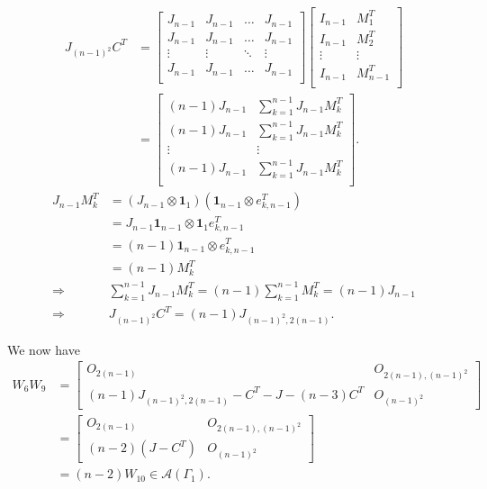 \begin{itemize}
    \begin{align*}
        J_{(n-1)^2}C^T
        &= \begin{bmatrix}
            J_{n-1} & J_{n-1}&\dots&J_{n-1}\\
            J_{n-1} & J_{n-1}&\dots&J_{n-1}\\
            \vdots & \vdots & \ddots & \vdots\\
            J_{n-1} & J_{n-1}&\dots&J_{n-1}\\
        \end{bmatrix}\begin{bmatrix}
            I_{n-1} & M_1^T \\
            I_{n-1} & M_2^T \\
            \vdots & \vdots \\
            I_{n-1} & M_{n-1}^T \\
        \end{bmatrix}\\
        &= \begin{bmatrix}
            (n-1)J_{n-1} & \sum_{k=1}^{n-1} J_{n-1}M_k^T \\
            (n-1)J_{n-1} & \sum_{k=1}^{n-1} J_{n-1}M_k^T \\
            \vdots & \vdots \\
            (n-1)J_{n-1} & \sum_{k=1}^{n-1} J_{n-1}M_k^T \\
        \end{bmatrix}.
    \end{align*}
    \begin{align*}
        J_{n-1}M_k^T &= (J_{n-1}\otimes \mathbf{1}_1)(\mathbf{1}_{n-1}\otimes e_{k,n-1}^T)\\
        &= J_{n-1}\mathbf{1}_{n-1} \otimes \mathbf{1}_1e_{k,n-1}^T\\
        &= (n-1)\mathbf{1}_{n-1}\otimes e_{k,n-1}^T\\
        &= (n-1)M_k^T\\
        \Rightarrow\quad&\sum_{k=1}^{n-1} J_{n-1}M_k^T = (n-1)\sum_{k=1}^{n-1}M_{k}^T = (n-1)J_{n-1} \\
        \Rightarrow\quad&J_{(n-1)^2}C^T = (n-1)J_{(n-1)^2, 2(n-1)}.
    \end{align*}

    We now have
    \begin{align*}
        W_6W_9
        &= \begin{bmatrix}
            O_{2(n-1)} & O_{2(n-1), (n-1)^2} \\
            (n-1)J_{(n-1)^2, 2(n-1)} - C^T -J - (n-3)C^T & O_{(n-1)^2}
        \end{bmatrix}\\
        &= \begin{bmatrix}
            O_{2(n-1)} & O_{2(n-1), (n-1)^2} \\
            (n-2)(J - C^T) & O_{(n-1)^2}
        \end{bmatrix}\\
        &= (n-2)W_{10}\in\mathcal{A}(\Gamma_1).
    \end{align*}
    

\end{itemize}
